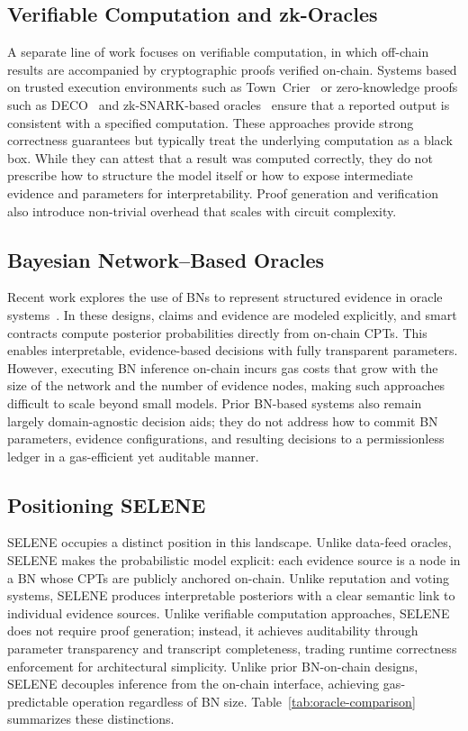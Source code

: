 \documentclass[journal]{IEEEtran}
\begin{document}
\subsection{Verifiable Computation and zk-Oracles}

A separate line of work focuses on verifiable
computation, in which off-chain results are accompanied
by cryptographic proofs verified on-chain.
Systems based on trusted execution environments such as
Town~Crier~\cite{zhang2016town} or zero-knowledge
proofs such as DECO~\cite{zhang2020deco} and
zk-SNARK-based oracles~\cite{garg2022succinct} ensure
that a reported output is consistent with a specified
computation.
These approaches provide strong correctness guarantees
but typically treat the underlying computation as a
black box.
While they can attest that a result was computed
correctly, they do not prescribe how to structure the
model itself or how to expose intermediate evidence and
parameters for interpretability.
Proof generation and verification also introduce
non-trivial overhead that scales with circuit complexity.

\subsection{Bayesian Network--Based Oracles}

Recent work explores the use of BNs to represent
structured evidence in oracle systems~\cite{bn-oracle}.
In these designs, claims and evidence are modeled
explicitly, and smart contracts compute posterior
probabilities directly from on-chain CPTs.
This enables interpretable, evidence-based decisions
with fully transparent parameters.
However, executing BN inference on-chain incurs gas
costs that grow with the size of the network and the
number of evidence nodes, making such approaches
difficult to scale beyond small models.
Prior BN-based systems also remain largely
domain-agnostic decision aids; they do not address how
to commit BN parameters, evidence configurations, and
resulting decisions to a permissionless ledger in a
gas-efficient yet auditable manner.

\subsection{Positioning SELENE}

SELENE occupies a distinct position in this landscape.
Unlike data-feed oracles, SELENE makes the probabilistic
model explicit: each evidence source is a node in a BN
whose CPTs are publicly anchored on-chain.
Unlike reputation and voting systems, SELENE produces
interpretable posteriors with a clear semantic link to
individual evidence sources.
Unlike verifiable computation approaches, SELENE does not
require proof generation; instead, it achieves
auditability through parameter transparency and
transcript completeness, trading runtime correctness
enforcement for architectural simplicity.
Unlike prior BN-on-chain designs, SELENE decouples
inference from the on-chain interface, achieving
gas-predictable operation regardless of BN size.
Table~\ref{tab:oracle-comparison} summarizes these
distinctions.
\end{document}
